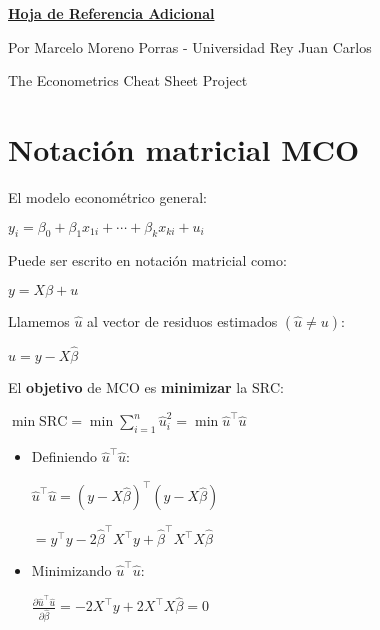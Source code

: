 \documentclass[10pt, a4paper, landscape]{article}
\newcommand{\SSR}{\text{SRC}}
\begin{document}
\begin{multicols}{3}

\begin{center}
	\textbf{\LARGE \href{https://github.com/marcelomijas/econometrics-cheatsheet}{Hoja de Referencia Adicional}}

	{\footnotesize Por Marcelo Moreno Porras - Universidad Rey Juan Carlos}

	{\footnotesize The Econometrics Cheat Sheet Project}
\end{center}

\section*{Notación matricial MCO}

El modelo econométrico general:

\begin{center}
	\( y_{i} = \beta_{0} + \beta_{1} x_{1i} + \cdots + \beta_{k} x_{ki} + u_{i} \)
\end{center}

Puede ser escrito en notación matricial como:

\begin{center}
	\( y = X \beta + u \)
\end{center}

Llamemos \( \hat{u} \) al vector de residuos estimados \( (\hat{u} \neq u) \):

\begin{center}
	\( \hat{u} = y - X \hat{\beta} \)
\end{center}

El \textbf{objetivo} de MCO es \textbf{minimizar} la \( \SSR \):

\begin{center}
	\( \min \SSR = \min \sum_{i = 1}^{n} \hat{u}_{i}^{2} = \min \hat{u}^{\top} \hat{u} \)
\end{center}

\begin{itemize}[leftmargin=*]
	\item Definiendo \( \hat{u}^{\top} \hat{u} \):
	\begin{center}
		\( \hat{u}^{\top} \hat{u} = (y - X \hat{\beta})^{\top} (y - X \hat{\beta}) \)

		\( = y^{\top} y - 2 \hat{\beta}^{\top} X^{\top} y + \hat{\beta}^{\top} X^{\top} X \hat{\beta} \)
	\end{center}
	\item Minimizando \( \hat{u}^{\top} \hat{u} \):
	\begin{center}
		\( \frac{\partial \hat{u}^{\top} \hat{u}}{\partial \hat{\beta}} = -2 X^{\top} y + 2 X^{\top} X \hat{\beta} = 0 \)


\end{center}
\end{itemize}
\end{multicols}
\end{document}
